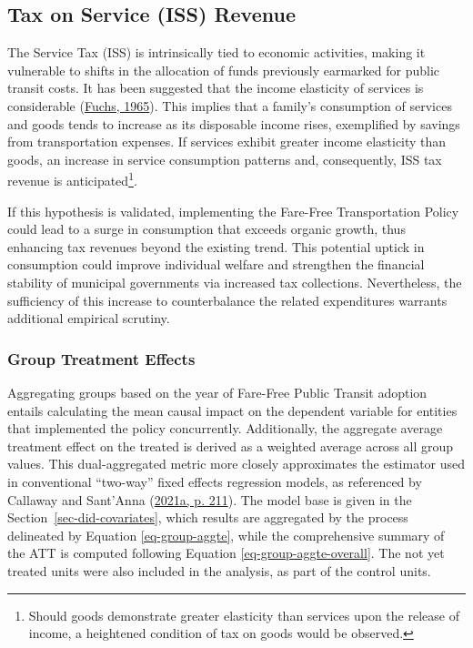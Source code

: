 \documentclass[12pt, a4paper, twoside]{article}
\numberwithin{equation}{subsection} %
\begin{document}
\hypertarget{sec-iss-results}{%
\subsection{Tax on Service (ISS) Revenue}\label{sec-iss-results}}

The Service Tax (ISS) is intrinsically tied to economic activities,
making it vulnerable to shifts in the allocation of funds previously
earmarked for public transit costs. It has been suggested that the
income elasticity of services is considerable
(\protect\hyperlink{ref-fuchs_1965}{Fuchs, 1965}). This implies that a
family's consumption of services and goods tends to increase as its
disposable income rises, exemplified by savings from transportation
expenses. If services exhibit greater income elasticity than goods, an
increase in service consumption patterns and, consequently, ISS tax
revenue is anticipated\footnote{Should goods demonstrate greater
  elasticity than services upon the release of income, a heightened
  condition of tax on goods would be observed.}.

If this hypothesis is validated, implementing the Fare-Free
Transportation Policy could lead to a surge in consumption that exceeds
organic growth, thus enhancing tax revenues beyond the existing trend.
This potential uptick in consumption could improve individual welfare
and strengthen the financial stability of municipal governments via
increased tax collections. Nevertheless, the sufficiency of this
increase to counterbalance the related expenditures warrants additional
empirical scrutiny.

\hypertarget{group-treatment-effects}{%
\subsubsection{Group Treatment Effects}\label{group-treatment-effects}}

Aggregating groups based on the year of Fare-Free Public Transit
adoption entails calculating the mean causal impact on the dependent
variable for entities that implemented the policy concurrently.
Additionally, the aggregate average treatment effect on the treated is
derived as a weighted average across all group values. This
dual-aggregated metric more closely approximates the estimator used in
conventional ``two-way'' fixed effects regression models, as referenced
by Callaway and Sant'Anna
(\protect\hyperlink{ref-CALLAWAY2021200}{2021a, p. 211}). The model base
is given in the Section~\ref{sec-did-covariates}, which results are
aggregated by the process delineated by Equation \eqref{eq-group-aggte},
while the comprehensive summary of the ATT is computed following
Equation \eqref{eq-group-aggte-overall}. The not yet treated units were
also included in the analysis, as part of the control units.
\end{document}
